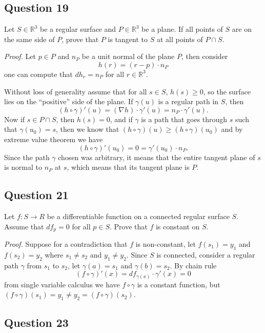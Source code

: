 \documentclass[12pt]{article}
\begin{document}
\subsection*{Question 19}

Let \(S \in \mathbb{R}^3\) be a regular surface and \(P \in \mathbb{R}^3\) be a plane.
If all points of \(S\) are on the same side of \(P\), prove that \(P\) is tangent to \(S\) at all points of \(P \cap S\).

\emph{Proof.}
Let \(p \in P\) and \(n_P\) be a unit normal of the plane \(P\), then consider \[ h(r) = (r - p)\cdot n_P \]
one can compute that \(dh_r = n_P\) for all \(r\in \mathbb{R}^3\).

Without loss of generality assume that for all \(s\in S\), \(h(s) \geq 0\), so the surface lies on the ``positive'' side of the plane.
If \(\gamma(u)\) is a regular path in \(S\), then
\[ (h\circ \gamma)'(u) = (\nabla h)\cdot \gamma'(u) = n_P \cdot \gamma'(u).\]
Now if \(s \in P\cap S\), then \(h(s) = 0\),
and if \(\gamma\) is a path that goes through \(s\) such that \(\gamma(u_0) = s\),
then we know that \((h\circ\gamma)(u) \geq (h\circ\gamma)(u_0)\) and by extreme value theorem we have
\[ (h\circ\gamma)'(u_0) = 0 = \gamma'(u_0)\cdot n_P. \]
Since the path \(\gamma\) chosen was arbitrary, it means that the entire tangent plane of \(s\) is normal to \(n_P\) at \(s\), which means that its tangent plane is \(P\).

\subsection*{Question 21}

Let \(f: S\to R\) be a differentiable function on a connected regular surface \(S\).
Assume that \(df_p = 0\) for all \(p\in S\).
Prove that \(f\) is constant on \(S\).

\emph{Proof.}
Suppose for a contradiction that \(f\) is non-constant, let \(f(s_1) = y_1\) and \(f(s_2) = y_2\) where \(s_1 \ne s_2\) and \(y_1 \ne y_2\).
Since \(S\) is connected, consider a regular path \(\gamma\) from \(s_1\) to \(s_2\), let \(\gamma(a) = s_1\) and \(\gamma(b) = s_2\).
By chain rule
\[ (f\circ \gamma)'(x) = df_{\gamma(x)}\cdot \gamma'(x) = 0 \]
from single variable calculus we have \(f\circ\gamma\) is a constant function,
but \((f\circ\gamma)(s_1) = y_1 \ne y_2 = (f\circ\gamma)(s_2)\).

\subsection*{Question 23}
\end{document}

